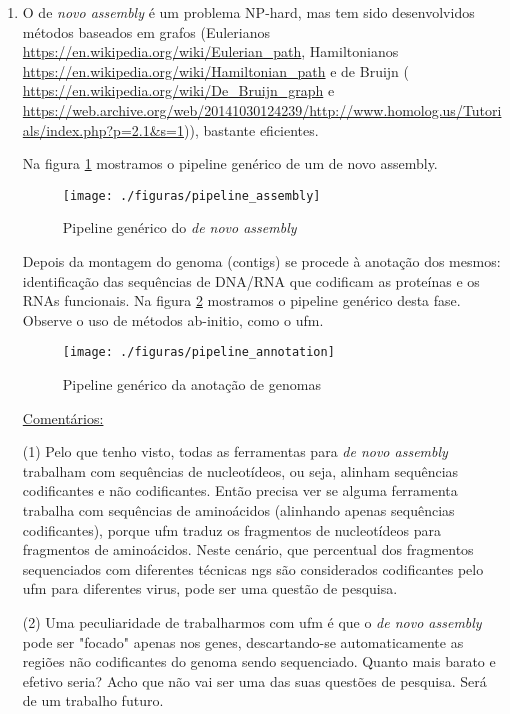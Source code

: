 \documentclass[12pt]{article}
\begin{document}
\begin{itemize}
\begin{enumerate}
        \item O de {\it{novo assembly}} é um problema NP-hard, mas tem sido desenvolvidos métodos baseados em grafos (Eulerianos \url{https://en.wikipedia.org/wiki/Eulerian_path}, Hamiltonianos \url{https://en.wikipedia.org/wiki/Hamiltonian_path} e de Bruijn ( \url{https://en.wikipedia.org/wiki/De_Bruijn_graph} e \url{https://web.archive.org/web/20141030124239/http://www.homolog.us/Tutorials/index.php?p=2.1&s=1})), bastante eficientes. 
        
        Na figura \ref{fig:assembly} mostramos o pipeline genérico de um de novo assembly.
        
        \begin{figure}[h!]
            \centering
            \texttt{[image: ./figuras/pipeline\_assembly]}
            \caption{Pipeline genérico do {\it{de novo assembly}}}
            \label{fig:assembly}
        \end{figure}
        
        Depois da montagem do genoma (contigs) se procede à anotação dos mesmos: identificação das sequências de DNA/RNA que codificam as proteínas e os RNAs funcionais. Na figura \ref{fig:annotation} mostramos o pipeline genérico desta fase. Observe o uso de métodos ab-initio, como o \gls{ufm}.  
        
        \begin{figure}[h!]
            \centering
            \texttt{[image: ./figuras/pipeline\_annotation]}
            \caption{Pipeline genérico da anotação  de genomas}
            \label{fig:annotation}
        \end{figure}
        
        
        \underline{Comentários:} 
        
        (1) Pelo que tenho visto, todas as ferramentas para {\it{de novo assembly}} trabalham com sequências de nucleotídeos, ou seja, alinham sequências codificantes e não codificantes. Então precisa ver se alguma ferramenta trabalha com sequências de aminoácidos (alinhando apenas sequências codificantes), porque \gls{ufm} traduz os fragmentos de nucleotídeos para fragmentos de aminoácidos. Neste cenário, que percentual dos fragmentos sequenciados com diferentes técnicas \gls{ngs} são considerados codificantes pelo \gls{ufm} para diferentes virus, pode ser uma questão de pesquisa. 
        
        (2) Uma peculiaridade de trabalharmos com \gls{ufm} é que o {\it{de novo assembly}} pode ser "focado" apenas nos genes, descartando-se automaticamente as regiões não codificantes do genoma sendo sequenciado. Quanto mais barato e efetivo seria? Acho que não vai ser uma das suas questões de pesquisa. Será de um trabalho futuro. 
        

\end{enumerate}
\end{itemize}
\end{document}
